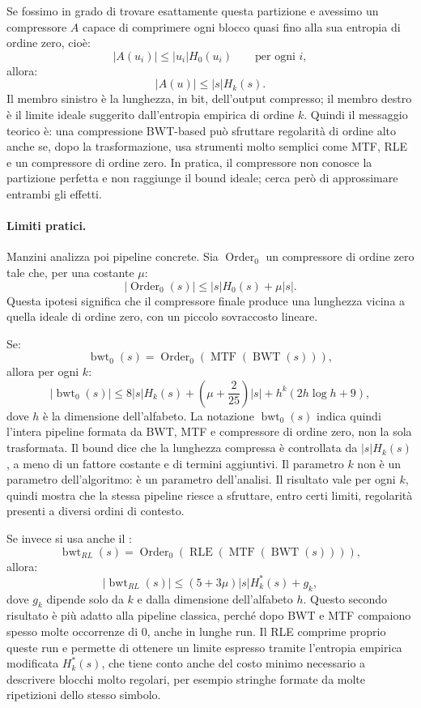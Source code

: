 \documentclass{article}
\theoremstyle{definition}
\numberwithin{equation}{section}
\begin{document}
Se fossimo in grado di trovare esattamente questa partizione e avessimo un compressore $A$ capace di comprimere ogni blocco quasi fino alla sua entropia di ordine zero, cioè:
\[
    |A(u_i)|\leq |u_i|H_0(u_i)
    \qquad
    \text{per ogni } i,
\]
allora:
\[
    |A(u)|\leq |s|H_k(s).
\]
Il membro sinistro è la lunghezza, in bit, dell'output compresso; il membro destro è il limite ideale suggerito dall'entropia empirica di ordine $k$. Quindi il messaggio teorico è: una compressione BWT-based può sfruttare regolarità di ordine alto anche se, dopo la trasformazione, usa strumenti molto semplici come MTF, RLE e un compressore di ordine zero. In pratica, il compressore non conosce la partizione perfetta e non raggiunge il bound ideale; cerca però di approssimare entrambi gli effetti.

\paragraph{Limiti pratici.}
Manzini analizza poi pipeline concrete. Sia $\operatorname{Order}_0$ un compressore di ordine zero tale che, per una costante $\mu$:
\[
    |\operatorname{Order}_0(s)|
    \leq
    |s|H_0(s)+\mu |s|.
\]
Questa ipotesi significa che il compressore finale produce una lunghezza vicina a quella ideale di ordine zero, con un piccolo sovraccosto lineare.

Se:
\[
    \operatorname{bwt}_0(s)
    =
    \operatorname{Order}_0(\operatorname{MTF}(\operatorname{BWT}(s))),
\]
allora per ogni $k$:
\begin{equation}\label{eq:manzini_bwt0_bound}
    |\operatorname{bwt}_0(s)|
    \leq
    8|s|H_k(s)
    +
    \left(\mu+\frac{2}{25}\right)|s|
    +
    h^k(2h\log h+9),
\end{equation}
dove $h$ è la dimensione dell'alfabeto. La notazione $\operatorname{bwt}_0(s)$ indica quindi l'intera pipeline formata da BWT, MTF e compressore di ordine zero, non la sola trasformata. Il bound dice che la lunghezza compressa è controllata da $|s|H_k(s)$, a meno di un fattore costante e di termini aggiuntivi. Il parametro $k$ non è un parametro dell'algoritmo: è un parametro dell'analisi. Il risultato vale per ogni $k$, quindi mostra che la stessa pipeline riesce a sfruttare, entro certi limiti, regolarità presenti a diversi ordini di contesto.

Se invece si usa anche il :
\[
    \operatorname{bwt}_{RL}(s)
    =
    \operatorname{Order}_0(\operatorname{RLE}(\operatorname{MTF}(\operatorname{BWT}(s)))),
\]
allora:
\begin{equation}\label{eq:manzini_bwtrl_bound}
    |\operatorname{bwt}_{RL}(s)|
    \leq
    (5+3\mu)|s|H_k^*(s)+g_k,
\end{equation}
dove $g_k$ dipende solo da $k$ e dalla dimensione dell'alfabeto $h$. Questo secondo risultato è più adatto alla pipeline classica, perché dopo BWT e MTF compaiono spesso molte occorrenze di $0$, anche in lunghe run. Il RLE comprime proprio queste run e permette di ottenere un limite espresso tramite l'entropia empirica modificata $H_k^*(s)$, che tiene conto anche del costo minimo necessario a descrivere blocchi molto regolari, per esempio stringhe formate da molte ripetizioni dello stesso simbolo.
\end{document}
